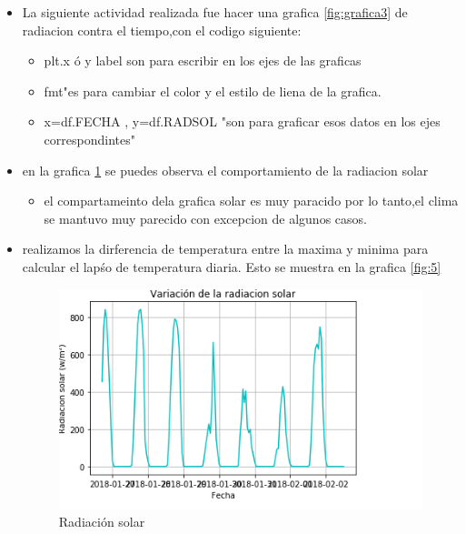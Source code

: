 \documentclass{article}
\begin{document}
\begin{itemize}
\item La siguiente actividad realizada fue hacer una grafica \ref{fig:grafica3} de radiacion contra el tiempo,con el codigo siguiente:

 \begin{itemize}
 \item
 plt.x ó y label son para escribir en los ejes de las graficas
 \item
 fmt"es para cambiar el color y el estilo de liena de la grafica.
 \item
 x=df.FECHA , y=df.RADSOL "son para graficar esos datos en los ejes correspondintes"

 \end{itemize}

 \item
en la grafica \ref{fig:4} se puedes observa el comportamiento de la radiacion solar
\begin{itemize}
\item el compartameinto dela grafica solar es muy paracido por lo tanto,el clima se mantuvo muy parecido con excepcion de algunos casos.
\end{itemize}
\item realizamos la dirferencia de temperatura entre la maxima y minima para calcular el lapśo de temperatura diaria. Esto se muestra en la grafica \ref{fig:5}



\begin{figure}[ht!]
 \includegraphics[width=1\linewidth]{5.png}
 \caption{Radiación solar}
 \label{fig:4}
 \end{figure}


\end{itemize}
\end{document}
